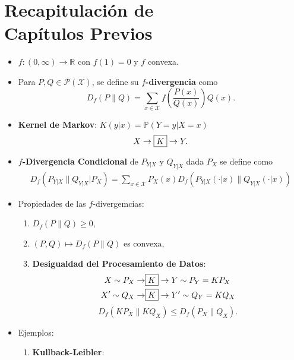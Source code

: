 \section{Recapitulaci\'on de\\
Cap\'itulos Previos}

\begin{itemize}
    \item $f\colon(0,\infty)\to\mathbb{R}$ con $f(1)=0$ y $f$ convexa.
    \item Para $P,Q\in\mathcal{P}(\mathcal{X})$, se define su \textbf{$f$-divergencia} como
    \begin{equation*}
        D_f(P\|Q)=\sum_{x\in\mathcal{X}}f\left(\frac{P(x)}{Q(x)}\right)Q(x).
    \end{equation*}
    \item \textbf{Kernel de Markov}: $K(y|x)=\mathbb{P}(Y=y|X=x)$
    \begin{equation*}
        X\to\fbox{$K$}\to Y.
    \end{equation*}
    \item \textbf{$f$-Divergencia Condicional} de $P_{Y|X}$ y $Q_{Y|X}$ dada $P_X$ se define como
    \begin{align*}
        D_f(P_{Y|X}\|Q_{Y|X}|P_X)=\sum_{x\in\mathcal{X}}P_X(x)D_f(P_{Y|X}(\cdot|x)\|Q_{Y|X}(\cdot|x))
    \end{align*}
    \item Propiedades de las $f$-divergemcias:
    \begin{enumerate}[label=(\alph*)]
        \item $D_f(P\|Q)\geq0$,
        \item $(P,Q)\mapsto D_f(P\|Q)$ es convexa,
        \item \textbf{Desigualdad del Procesamiento de Datos}:
        \begin{align*}
            X\sim P_X\to&\fbox{$K$}\to Y\sim P_Y=KP_X\\
            X'\sim Q_X\to&\fbox{$K$}\to Y'\sim Q_Y=KQ_X
        \end{align*}
        \begin{equation*}
            D_f(KP_X\|KQ_X)\leq D_f(P_X\|Q_X).
        \end{equation*}
        \end{enumerate}
        \item Ejemplos:
        \begin{enumerate}[label=(\alph*)]
            \item \textbf{Kullback-Leibler}:
            \begin{equation*}

\end{equation*}
\end{enumerate}
\end{itemize}
